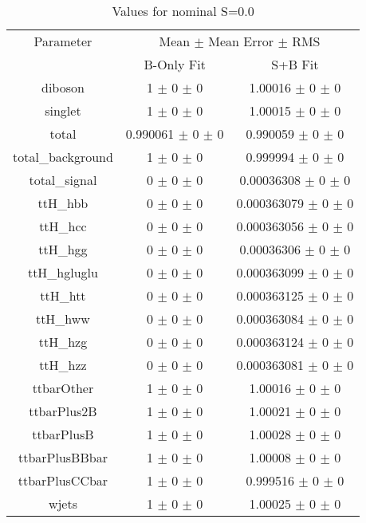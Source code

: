 \begin{table}
\centering
\caption{Values for nominal S=0.0}
\begin{tabular}{ccc}
\toprule
Parameter 	& \multicolumn{2}{c}{Mean $\pm$ Mean Error $\pm$ RMS}\\
 	& B-Only Fit & S+B Fit\\
\midrule
diboson 	& \num{1} $\pm$ \num{0} $\pm$ \num{0} 	& \num{1.00016} $\pm$ \num{0} $\pm$ \num{0}\\
singlet 	& \num{1} $\pm$ \num{0} $\pm$ \num{0} 	& \num{1.00015} $\pm$ \num{0} $\pm$ \num{0}\\
total 	& \num{0.990061} $\pm$ \num{0} $\pm$ \num{0} 	& \num{0.990059} $\pm$ \num{0} $\pm$ \num{0}\\
total\_background 	& \num{1} $\pm$ \num{0} $\pm$ \num{0} 	& \num{0.999994} $\pm$ \num{0} $\pm$ \num{0}\\
total\_signal 	& \num{0} $\pm$ \num{0} $\pm$ \num{0} 	& \num{0.00036308} $\pm$ \num{0} $\pm$ \num{0}\\
ttH\_hbb 	& \num{0} $\pm$ \num{0} $\pm$ \num{0} 	& \num{0.000363079} $\pm$ \num{0} $\pm$ \num{0}\\
ttH\_hcc 	& \num{0} $\pm$ \num{0} $\pm$ \num{0} 	& \num{0.000363056} $\pm$ \num{0} $\pm$ \num{0}\\
ttH\_hgg 	& \num{0} $\pm$ \num{0} $\pm$ \num{0} 	& \num{0.00036306} $\pm$ \num{0} $\pm$ \num{0}\\
ttH\_hgluglu 	& \num{0} $\pm$ \num{0} $\pm$ \num{0} 	& \num{0.000363099} $\pm$ \num{0} $\pm$ \num{0}\\
ttH\_htt 	& \num{0} $\pm$ \num{0} $\pm$ \num{0} 	& \num{0.000363125} $\pm$ \num{0} $\pm$ \num{0}\\
ttH\_hww 	& \num{0} $\pm$ \num{0} $\pm$ \num{0} 	& \num{0.000363084} $\pm$ \num{0} $\pm$ \num{0}\\
ttH\_hzg 	& \num{0} $\pm$ \num{0} $\pm$ \num{0} 	& \num{0.000363124} $\pm$ \num{0} $\pm$ \num{0}\\
ttH\_hzz 	& \num{0} $\pm$ \num{0} $\pm$ \num{0} 	& \num{0.000363081} $\pm$ \num{0} $\pm$ \num{0}\\
ttbarOther 	& \num{1} $\pm$ \num{0} $\pm$ \num{0} 	& \num{1.00016} $\pm$ \num{0} $\pm$ \num{0}\\
ttbarPlus2B 	& \num{1} $\pm$ \num{0} $\pm$ \num{0} 	& \num{1.00021} $\pm$ \num{0} $\pm$ \num{0}\\
ttbarPlusB 	& \num{1} $\pm$ \num{0} $\pm$ \num{0} 	& \num{1.00028} $\pm$ \num{0} $\pm$ \num{0}\\
ttbarPlusBBbar 	& \num{1} $\pm$ \num{0} $\pm$ \num{0} 	& \num{1.00008} $\pm$ \num{0} $\pm$ \num{0}\\
ttbarPlusCCbar 	& \num{1} $\pm$ \num{0} $\pm$ \num{0} 	& \num{0.999516} $\pm$ \num{0} $\pm$ \num{0}\\
wjets 	& \num{1} $\pm$ \num{0} $\pm$ \num{0} 	& \num{1.00025} $\pm$ \num{0} $\pm$ \num{0}\\
\bottomrule
\end{tabular}
\end{table}